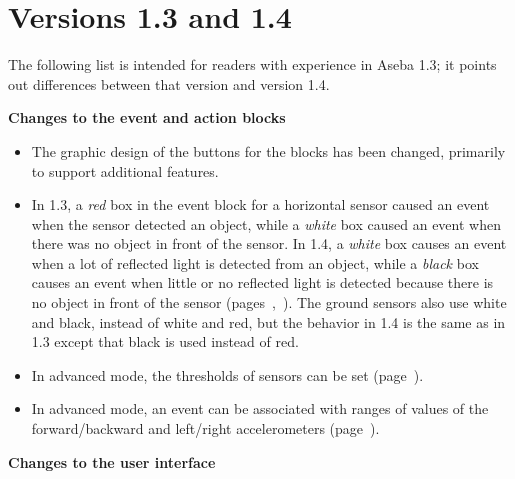 \chapter*{Versions 1.3 and 1.4}

The following list is intended for readers with experience in Aseba 1.3;
it points out differences between that version and version 1.4.

\textbf{Changes to the event and action blocks}

\begin{itemize}

\item The graphic design of the buttons for the blocks has been changed,
primarily to support additional features.

\item In 1.3, a \emph{red} box in the event block for a horizontal
sensor caused an event when the sensor detected an object, while a
\emph{white} box caused an event when there was no object in front of
the sensor. In 1.4, a \emph{white} box causes an event when a lot of
reflected light is detected from an object, while a \emph{black} box
causes an event when little or no reflected light is detected because
there is no object in front of the sensor
(pages~\pageref{p.proximity-colors1},~\pageref{p.proximity-colors2}).
The ground sensors also use white and black, instead of white and red,
but the behavior in 1.4 is the same as in 1.3 except that black is used
instead of red.


\item In advanced mode, the thresholds of sensors can be
set (page~\pageref{p.proximity-sensitivity}).

\item In advanced mode, an event can be associated with ranges of values
of the forward/backward and left/right accelerometers
(page~\pageref{p.accel}).


\end{itemize}

\textbf{Changes to the user interface}

